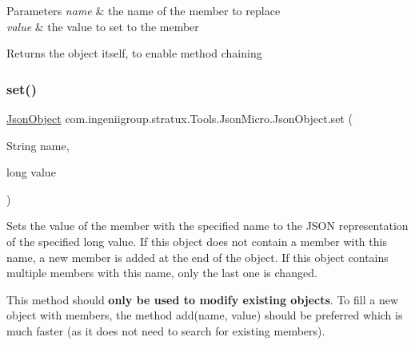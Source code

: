 \begin{DoxyParams}{Parameters}
{\em name} & the name of the member to replace \\
\hline
{\em value} & the value to set to the member \\
\hline
\end{DoxyParams}
\begin{DoxyReturn}{Returns}
the object itself, to enable method chaining 
\end{DoxyReturn}
\mbox{\label{classcom_1_1ingeniigroup_1_1stratux_1_1_tools_1_1_json_micro_1_1_json_object_a696d1b2fc8800ae7fa064713a87d1f11}} 
\subsubsection{\texorpdfstring{set()}{set()}\hspace{0.1cm}{\footnotesize\ttfamily [2/7]}}
{\footnotesize\ttfamily \hyperlink{classcom_1_1ingeniigroup_1_1stratux_1_1_tools_1_1_json_micro_1_1_json_object}{Json\+Object} com.\+ingeniigroup.\+stratux.\+Tools.\+Json\+Micro.\+Json\+Object.\+set (\begin{DoxyParamCaption}\item[{String}]{name,  }\item[{long}]{value }\end{DoxyParamCaption})}

Sets the value of the member with the specified name to the J\+S\+ON representation of the specified {\ttfamily long} value. If this object does not contain a member with this name, a new member is added at the end of the object. If this object contains multiple members with this name, only the last one is changed. 

This method should {\bfseries only be used to modify existing objects}. To fill a new object with members, the method {\ttfamily add(name, value)} should be preferred which is much faster (as it does not need to search for existing members). 


